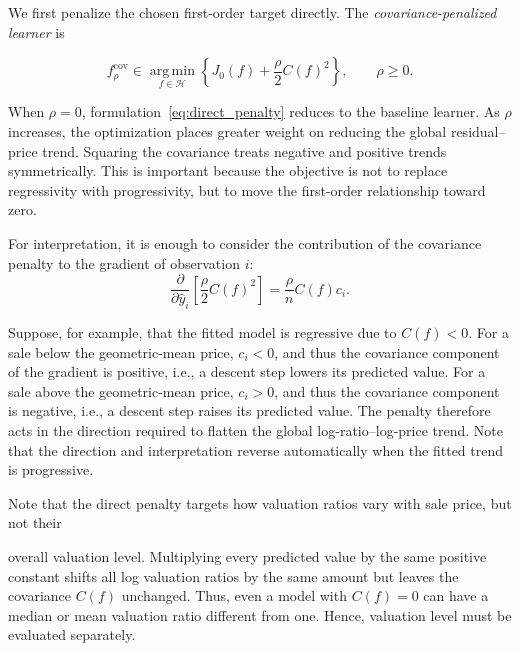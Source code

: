 \documentclass[10pt]{article}
\theoremstyle{definition}
\newcommand{\1}{\mathbf{1}}
\newcommand{\Hcal}{\mathcal{H}}
\newcommand{\argminop}{\operatorname*{arg\,min}}
\begin{document}
{We first penalize the chosen first-order target directly. The \emph{covariance-penalized learner} is}


{
\begin{equation}
\label{eq:direct_penalty}
f_\rho^{\mathrm{cov}}
\in
\argminop_{f\in\Hcal}
\left\{
J_0(f)+\frac{\rho}{2}C(f)^2
\right\},
\qquad
\rho\geq 0.
\end{equation}
}

When $\rho=0$, formulation~\eqref{eq:direct_penalty} reduces to the baseline learner. As $\rho$ increases, the optimization places greater weight on reducing the global residual--price trend. Squaring the covariance treats negative and positive trends symmetrically. This is important because the objective is not to replace regressivity with progressivity, but to move the first-order relationship toward zero.


{For interpretation, it is enough to consider the contribution of the covariance penalty to the gradient of observation $i$:}
{
\begin{equation}
\label{eq:direct_penalty_gradient}
\frac{\partial}{\partial \widehat y_i}
\left[
\frac{\rho}{2}C(f)^2
\right]
=
\frac{\rho}{n}C(f)c_i.
\end{equation}
}


{Suppose, for example, that the fitted model is regressive due to $C(f)<0$. For a sale below the geometric-mean price, $c_i<0$, and thus the covariance component of the gradient is positive, i.e., a descent step lowers its predicted value. For a sale above the geometric-mean price, $c_i>0$, and thus the covariance component is negative, i.e., a descent step raises its predicted value. The penalty therefore acts in the direction required to flatten the global log-ratio--log-price trend. Note that the direction and interpretation reverse automatically when the fitted trend is progressive.}


Note that the direct penalty targets how valuation ratios vary with sale price, but not their

overall valuation level. Multiplying every predicted value by the same positive constant shifts all log valuation ratios by the same amount but leaves the covariance $C(f)$ unchanged. Thus, even a model with $C(f)=0$ can have a median or mean valuation ratio different from one. Hence, valuation level must be evaluated separately.
\end{document}
